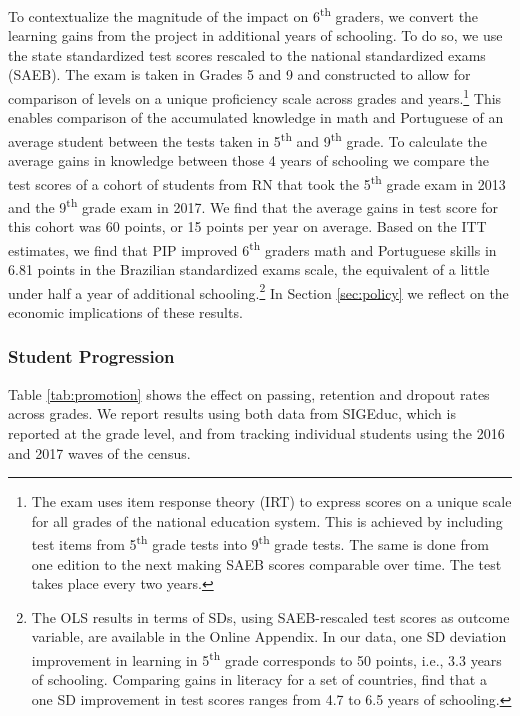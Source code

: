 \documentclass[11pt,a4paper]{article}
\begin{document}
To contextualize the magnitude of the impact on 6\textsuperscript{th} graders, we convert the learning gains from the project in additional years of schooling. To do so, we use the state standardized test scores rescaled to the national standardized exams (SAEB). The exam is taken in Grades 5 and 9 and constructed to allow for comparison of levels on a unique proficiency scale across grades and years.\footnote{The exam uses item response theory (IRT) to express scores on a unique scale for all grades of the national education system. This is achieved by including test items from 5\textsuperscript{th} grade tests into 9\textsuperscript{th} grade tests. The same is done from one edition to the next making SAEB scores comparable over time. The test takes place every two years.} This enables comparison of the accumulated knowledge in math and Portuguese of an average student between the tests taken in 5\textsuperscript{th} and 9\textsuperscript{th} grade. To calculate the average gains in knowledge between those 4 years of schooling we compare the test scores of a cohort of students from RN that took the 5\textsuperscript{th} grade exam in 2013 and the 9\textsuperscript{th} grade exam in 2017. We find that the average gains in test score for this cohort was 60 points, or 15 points per year on average. Based on the ITT estimates, we find that PIP improved 6\textsuperscript{th} graders math and Portuguese skills in 6.81 points in the Brazilian standardized exams scale, the equivalent of a little under half a year of additional schooling.\footnote{The OLS results in terms of SDs, using SAEB-rescaled test scores as outcome variable, are available in the Online Appendix. In our data, one SD deviation improvement in learning in 5\textsuperscript{th} grade corresponds to 50 points, i.e., 3.3 years of schooling. Comparing gains in literacy for a set of countries, \citet{evans2019equivalent} find that a one SD improvement in test scores ranges from 4.7 to 6.5 years of schooling.} In Section \ref{sec:policy} we reflect on the economic implications of these results.

\subsubsection*{Student Progression} \label{sec:flow}

Table \ref{tab:promotion} shows the effect on passing, retention and dropout rates across grades. We report results using both data from SIGEduc, which is reported at the grade level, and from tracking individual students using the 2016 and 2017 waves of the census. 
\end{document}
